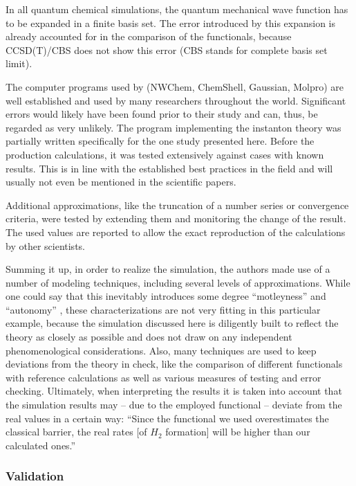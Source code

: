 \documentclass[12pt, a4paper]{article}
\numberwithin{equation}{section}
\begin{document}
In all quantum chemical simulations, the quantum mechanical wave
function has to be expanded in a finite basis set. The error introduced by
this expansion is already accounted for in the comparison of the
functionals, because CCSD(T)/CBS does not show this error (CBS stands for
complete basis set limit). 

The computer programs used by \citet{goumans-kaestner:2010} (NWChem,
ChemShell, Gaussian, Molpro) are well established and used by many
researchers throughout the world. Significant errors would likely have been
found prior to their study and can, thus, be regarded as very unlikely. The
program implementing the instanton theory was partially written specifically
for the one study presented here. Before the production calculations, it was
tested extensively against cases with known results. This is in line
with the established best practices in the field and will usually not
even be mentioned in the scientific papers. 

Additional approximations, like the truncation of a number series or
convergence criteria, were tested by extending them and monitoring the
change of the result. The used values are reported to allow the exact
reproduction of the calculations by other scientists.

Summing it up, in order to realize the simulation, the authors made
use of a number of modeling techniques, including several levels of
approximations. While one could say that this inevitably introduces
some degree ``motleyness'' and ``autonomy'' \citep{winsberg:2001},
these characterizations are not very fitting in this particular
example, because the simulation discussed here is diligently built to
reflect the theory as closely as possible and does not draw on
any independent phenomenological considerations. Also, many techniques
are used to keep deviations from the theory in check, like the
comparison of different functionals with reference calculations as
well as various measures of testing and error checking. Ultimately,
when interpreting the results it is taken into account that the
simulation results may -- due to the employed functional -- deviate
from the real values in a certain way: ``Since the functional we used
overestimates the classical barrier, the real rates [of $H_2$
formation] will be higher than our calculated
ones.''\cite[p. 7352]{goumans-kaestner:2010}


\subsubsection{Validation}
\label{Validation}
\end{document}

